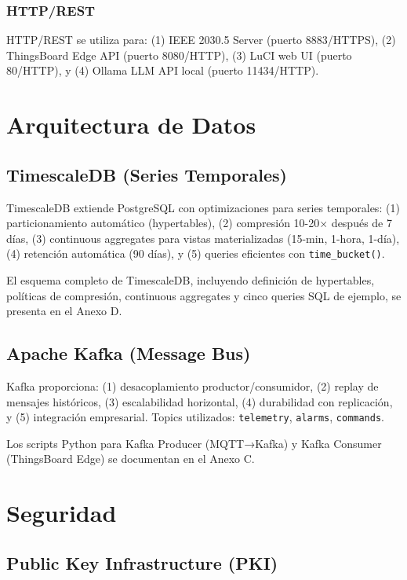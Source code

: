 \subsubsection{HTTP/REST}

HTTP/REST se utiliza para: (1) IEEE 2030.5 Server (puerto 8883/HTTPS), (2) ThingsBoard Edge API (puerto 8080/HTTP), (3) LuCI web UI (puerto 80/HTTP), y (4) Ollama LLM API local (puerto 11434/HTTP).

\section{Arquitectura de Datos}

\subsection{TimescaleDB (Series Temporales)}

TimescaleDB extiende PostgreSQL con optimizaciones para series temporales: (1) particionamiento automático (hypertables), (2) compresión 10-20$\times$ después de 7 días, (3) continuous aggregates para vistas materializadas (15-min, 1-hora, 1-día), (4) retención automática (90 días), y (5) queries eficientes con \texttt{time\_bucket()}.

El esquema completo de TimescaleDB, incluyendo definición de hypertables, políticas de compresión, continuous aggregates y cinco queries SQL de ejemplo, se presenta en el Anexo D.

\subsection{Apache Kafka (Message Bus)}

Kafka proporciona: (1) desacoplamiento productor/consumidor, (2) replay de mensajes históricos, (3) escalabilidad horizontal, (4) durabilidad con replicación, y (5) integración empresarial. Topics utilizados: \texttt{telemetry}, \texttt{alarms}, \texttt{commands}.

Los scripts Python para Kafka Producer (MQTT→Kafka) y Kafka Consumer (ThingsBoard Edge) se documentan en el Anexo C.

\section{Seguridad}

\subsection{Public Key Infrastructure (PKI)}

